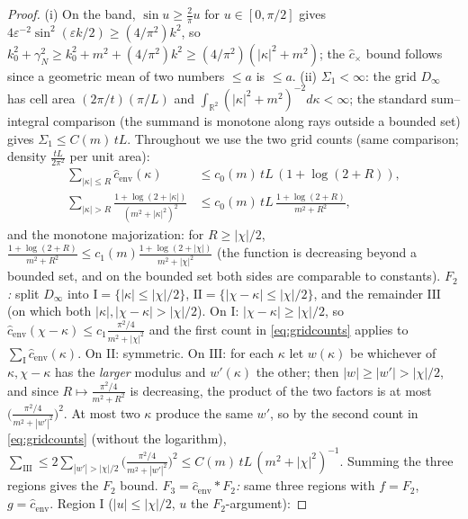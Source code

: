 \documentclass[11pt,a4paper]{article}
\theoremstyle{plain}
\theoremstyle{definition}
\newcommand{\R}{\mathbb{R}}
\newcommand{\eps}{\varepsilon}
\begin{document}
\begin{proof}
(i) On the band, $\sin u\ge\tfrac2\pi u$ for $u\in[0,\pi/2]$ gives
$4\eps^{-2}\sin^2(\eps k/2)\ge(4/\pi^2)k^2$, so
$k_0^2+\gamma_N^2\ge k_0^2+m^2+(4/\pi^2)k^2
\ge(4/\pi^2)(|\kappa|^2+m^2)$; the $\hat c_\times$ bound follows since a
geometric mean of two numbers $\le a$ is $\le a$.
(ii) $\Sigma_1<\infty$: the grid $D_\infty$ has cell area
$(2\pi/t)(\pi/L)$ and $\int_{\R^2}(|\kappa|^2+m^2)^{-2}d\kappa<\infty$; the
standard sum--integral comparison (the summand is monotone along rays outside
a bounded set) gives $\Sigma_1\le C(m)\,tL$. Throughout we use the two grid
counts (same comparison; density $\tfrac{tL}{2\pi^2}$ per unit area):
\begin{equation}
 \begin{split}
 \sum_{|\kappa|\le R}\hat c_{\mathrm{env}}(\kappa)
 &\le c_0(m)\,tL\,(1+\log(2+R)),\\
 \sum_{|\kappa|>R}\frac{1+\log(2+|\kappa|)}{(m^2+|\kappa|^2)^2}
 &\le c_0(m)\,tL\,\frac{1+\log(2+R)}{m^2+R^2},
 \end{split}
 \label{eq:gridcounts}
\end{equation}
and the monotone majorization: for $R\ge|\chi|/2$,
$\frac{1+\log(2+R)}{m^2+R^2}\le c_1(m)\frac{1+\log(2+|\chi|)}{m^2+|\chi|^2}$
(the function is decreasing beyond a bounded set, and on the bounded set both
sides are comparable to constants).
\emph{$F_2$:} split $D_\infty$ into
$\mathrm I=\{|\kappa|\le|\chi|/2\}$,
$\mathrm{II}=\{|\chi-\kappa|\le|\chi|/2\}$, and the remainder $\mathrm{III}$
(on which both $|\kappa|,|\chi-\kappa|>|\chi|/2$). On $\mathrm I$:
$|\chi-\kappa|\ge|\chi|/2$, so
$\hat c_{\mathrm{env}}(\chi-\kappa)\le c_1\frac{\pi^2/4}{m^2+|\chi|^2}$
and the first count in \eqref{eq:gridcounts} applies to
$\sum_{\mathrm I}\hat c_{\mathrm{env}}(\kappa)$. On $\mathrm{II}$:
symmetric. On $\mathrm{III}$: for each $\kappa$ let
$w(\kappa)$ be whichever of $\kappa,\chi-\kappa$ has the \emph{larger}
modulus and $w'(\kappa)$ the other; then $|w|\ge|w'|>|\chi|/2$, and since
$R\mapsto\frac{\pi^2/4}{m^2+R^2}$ is decreasing, the product of the two
factors is at most $\bigl(\frac{\pi^2/4}{m^2+|w'|^2}\bigr)^2$. At most two
$\kappa$ produce the same $w'$, so by the second count in
\eqref{eq:gridcounts} (without the logarithm),
$\sum_{\mathrm{III}}\le2\sum_{|w'|>|\chi|/2}
\bigl(\tfrac{\pi^2/4}{m^2+|w'|^2}\bigr)^2
\le C(m)\,tL\,(m^2+|\chi|^2)^{-1}$. Summing the three regions
gives the $F_2$ bound.
\emph{$F_3=\hat c_{\mathrm{env}}*F_2$:} same three regions with
$f=F_2$, $g=\hat c_{\mathrm{env}}$. Region $\mathrm I$
($|u|\le|\chi|/2$, $u$ the $F_2$-argument):

\end{proof}
\end{document}
